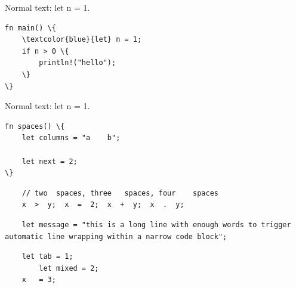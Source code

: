 \documentclass{article}
\begin{document}
Normal text: let n = 1.
\begin{Verbatim}
fn main() \{
    \textcolor{blue}{let} n = 1;
    if n > 0 \{
        println!("hello");
    \}
\}
\end{Verbatim}
Normal text: let n = 1.
\begin{Verbatim}
fn spaces() \{
    let columns = "a    b";

    let next = 2;
\}
\end{Verbatim}
\begin{Verbatim}
    // two  spaces, three   spaces, four    spaces
    x  >  y;  x  =  2;  x  +  y;  x  .  y;
\end{Verbatim}
\begin{minipage}{180pt}
\begin{Verbatim}
    let message = "this is a long line with enough words to trigger automatic line wrapping within a narrow code block";
\end{Verbatim}
\end{minipage}
\begin{Verbatim}
	let tab = 1;
    	let mixed = 2;
    x	= 3;
\end{Verbatim}
\end{document}
